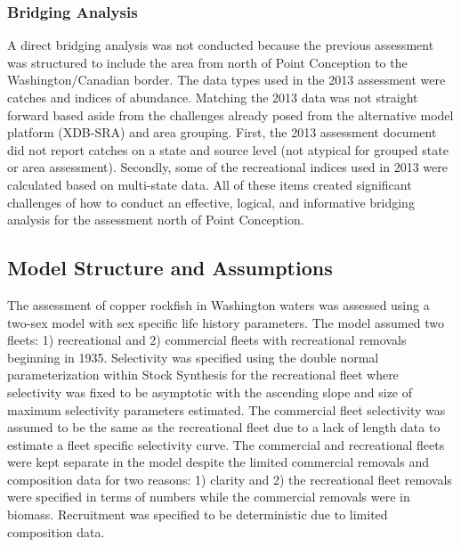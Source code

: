 \documentclass[11pt,
  english,
  a4paper,
]{article}
\begin{document}
\leavevmode\tagmcend\tagstructend\par


\hypertarget{bridging-analysis}{%
\subsubsection{Bridging Analysis}\label{bridging-analysis}}

\leavevmode\tagmcend\tagstructend


A direct bridging analysis was not conducted because the previous assessment was structured to include the area from north of Point Conception to the Washington/Canadian border. The data types used in the 2013 assessment were catches and indices of abundance. Matching the 2013 data was not straight forward based aside from the challenges already posed from the alternative model platform (XDB-SRA) and area grouping. First, the 2013 assessment document did not report catches on a state and source level (not atypical for grouped state or area assessment). Secondly, some of the recreational indices used in 2013 were calculated based on multi-state data. All of these items created significant challenges of how to conduct an effective, logical, and informative bridging analysis for the assessment north of Point Conception.

\leavevmode\tagmcend\tagstructend\par


\hypertarget{model-structure-and-assumptions}{%
\subsection{Model Structure and Assumptions}\label{model-structure-and-assumptions}}

\leavevmode\tagmcend\tagstructend


The assessment of copper rockfish in Washington waters was assessed using a two-sex model with sex specific life history parameters. The model assumed two fleets: 1) recreational and 2) commercial fleets with recreational removals beginning in 1935. Selectivity was specified using the double normal parameterization within Stock Synthesis for the recreational fleet where selectivity was fixed to be asymptotic with the ascending slope and size of maximum selectivity parameters estimated. The commercial fleet selectivity was assumed to be the same as the recreational fleet due to a lack of length data to estimate a fleet specific selectivity curve. The commercial and recreational fleets were kept separate in the model despite the limited commercial removals and composition data for two reasons: 1) clarity and 2) the recreational fleet removals were specified in terms of numbers while the commercial removals were in biomass. Recruitment was specified to be deterministic due to limited composition data.
\end{document}
